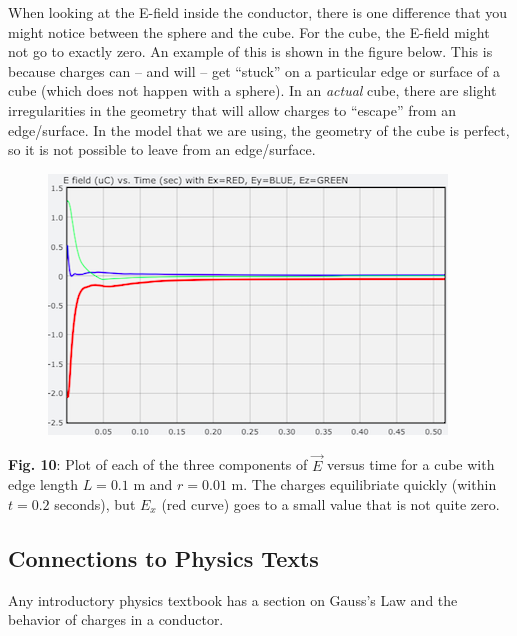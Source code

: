 \documentclass[]{article}
\begin{document}
When looking at the E-field inside the conductor, there is one
difference that you might notice between the sphere and the cube. For
the cube, the E-field might not go to exactly zero. An example of this
is shown in the figure below. This is because charges can -- and will --
get ``stuck'' on a particular edge or surface of a cube (which does not
happen with a sphere). In an \emph{actual} cube, there are slight
irregularities in the geometry that will allow charges to ``escape''
from an edge/surface. In the model that we are using, the geometry of
the cube is perfect, so it is not possible to leave from an
edge/surface.

\begin{figure}[htbp]
\centering
\includegraphics{images/InsideCube.png}
\caption{}
\end{figure}

\textbf{Fig. 10}: Plot of each of the three components of \(\vec{E}\)
versus time for a cube with edge length \(L=0.1\) m and \(r=0.01\) m.
The charges equilibriate quickly (within \(t=0.2\) seconds), but \(E_x\)
(red curve) goes to a small value that is not quite zero.

\subsection{Connections to Physics
Texts}\label{connections-to-physics-texts}

Any introductory physics textbook has a section on Gauss's Law and the
behavior of charges in a conductor.
\end{document}
